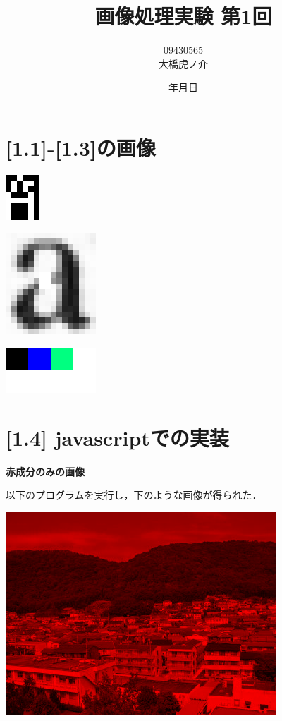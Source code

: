 \documentclass[11pt]{jarticle}
\begin{document}
\title{画像処理実験 第1回}
\author{09430565\\大橋虎ノ介}
\date{\number\year 年\number\month 月\number\day 日}
\maketitle

\section{[1.1]-[1.3]の画像}

\includegraphics[scale=.5]{./img/download11.png}

\includegraphics[scale=.5]{./img/download12.png}

\includegraphics[scale=.5]{./img/download13.png}

\section{[1.4] javascriptでの実装}

{\bf 赤成分のみの画像}

以下のプログラムを実行し，下のような画像が得られた．

\includegraphics[scale=.5]{./img/js_redonly.png}
\end{document}
